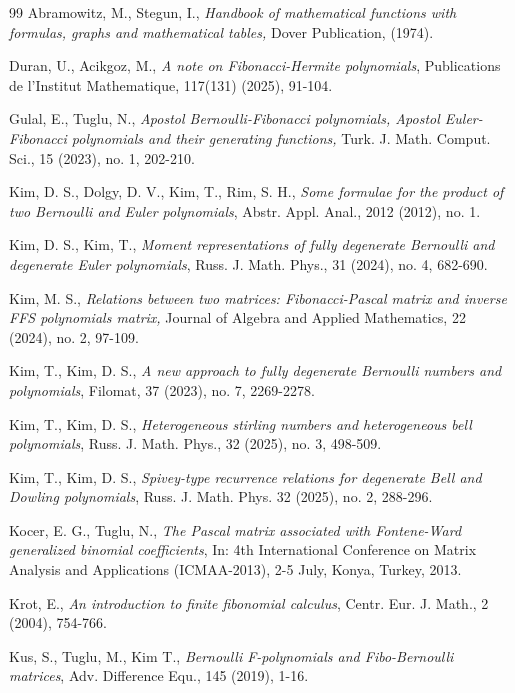 \documentclass[12pt, a4paper]{article}
\begin{document}
\begin{thebibliography}{99}
 Abramowitz, M., Stegun, I., \textit{Handbook of mathematical functions with formulas, graphs and mathematical tables,} Dover Publication, (1974).

 Duran, U., Acikgoz, M., \textit{A note on Fibonacci-Hermite polynomials}, Publications de l'Institut Mathematique, 117(131) (2025), 91-104.

 Gulal, E., Tuglu, N., \textit{Apostol Bernoulli-Fibonacci polynomials, Apostol Euler-Fibonacci polynomials and their generating functions,} Turk. J. Math. Comput. Sci., 15 (2023), no. 1, 202-210.

 Kim, D. S., Dolgy, D. V., Kim, T., Rim, S. H., \textit{Some formulae for the product of two Bernoulli and Euler polynomials}, Abstr. Appl. Anal., 2012 (2012), no. 1.

 Kim, D. S., Kim, T., \textit{Moment representations of fully degenerate Bernoulli and degenerate Euler polynomials}, Russ. J. Math. Phys., 31 (2024), no. 4, 682-690.


 Kim, M. S., \textit{Relations between two matrices: Fibonacci-Pascal matrix and inverse FFS polynomials matrix,} Journal of Algebra and Applied Mathematics, 22 (2024), no. 2, 97-109.

 Kim, T., Kim, D. S., \textit{A new approach to fully degenerate Bernoulli numbers and polynomials}, Filomat, 37 (2023), no. 7, 2269-2278.

 Kim, T., Kim, D. S., \textit{Heterogeneous stirling numbers and heterogeneous bell polynomials}, Russ. J. Math. Phys., 32 (2025), no. 3, 498-509.

 Kim, T., Kim, D. S., \textit{Spivey-type recurrence relations for degenerate Bell and Dowling polynomials}, Russ. J. Math. Phys. 32 (2025), no. 2, 288-296.

 Kocer, E. G., Tuglu, N., \textit{The Pascal matrix associated with Fontene-Ward generalized binomial coefficients}, In: 4th International Conference on Matrix Analysis and Applications (ICMAA-2013), 2-5 July, Konya, Turkey, 2013.

 Krot, E., \textit{An introduction to finite fibonomial calculus}, Centr. Eur. J. Math., 2 (2004), 754-766.

 Kus, S., Tuglu, M., Kim T., \textit{Bernoulli F-polynomials and Fibo-Bernoulli matrices}, Adv. Difference Equ., 145 (2019), 1-16.


\end{thebibliography}
\end{document}
